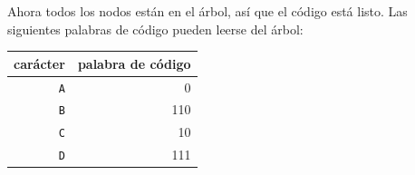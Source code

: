 Ahora todos los nodos están en el árbol, así que el código está listo.
Las siguientes palabras de código pueden leerse del árbol:
\begin{center}
\begin{tabular}{rr}
carácter & palabra de código \\
\hline
\texttt{A} & 0 \\
\texttt{B} & 110 \\
\texttt{C} & 10 \\
\texttt{D} & 111 \\
\end{tabular}
\end{center}
